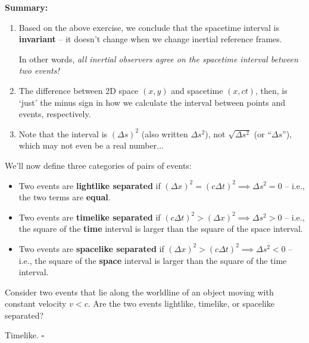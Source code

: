 \documentclass[11pt, letterpaper, openany]{book}
\newenvironment{exercise}[1][Exercise]{%
  \tcolorbox[blanker, breakable, left=1em,
    before skip=1em, after skip=1em,
    borderline west={3pt}{0pt}{PhysNavy},
    colback=PhysCream,
    before upper={\textcolor{PhysNavy}{\sffamily\bfseries #1:}\space}
  ]%
}{%
  \endtcolorbox%
}
\newenvironment{solution}[1][Solution]{%
  \tcolorbox[blanker, breakable, left=1em,
    before skip=1em, after skip=1em,
    borderline west={2pt}{0pt}{PhysTeal},
    colback=PhysCream,
    before upper={\textcolor{PhysTeal}{\sffamily\bfseries #1.}\space}
  ]%
}{%
  \hfill\textcolor{PhysTeal}{\ensuremath{\square}}\endtcolorbox%
}
\begin{document}
\textbf{Summary:}
\begin{enumerate}
    \item Based on the above exercise, we conclude that the spacetime interval is \textbf{invariant} -- it doesn't change when we change inertial reference frames.
    
    In other words, \textit{all inertial observers agree on the spacetime interval between two events!}
    \item The difference between 2D space $(x, y)$ and spacetime $(x, ct)$, then, is `just' the minus sign in how we calculate the interval between points and events, respectively.
    \item Note that the interval is $(\Delta s)^2$ (also written $\Delta s^2$), not $\sqrt{\Delta s^2}$ (or ``$\Delta s$''), which may not even be a real number...
\end{enumerate}

We'll now define three categories of pairs of events:

\begin{itemize}
    \item Two events are \textbf{lightlike separated} if $(\Delta x)^2 = (c\Delta t)^2 \implies \Delta s^2 = 0$
    -- i.e., the two terms are \textbf{equal}.
    
    \item Two events are \textbf{timelike separated} if $(c\Delta t)^2 > (\Delta x)^2 \implies \Delta s^2 > 0$
    -- i.e., the square of the \textbf{time} interval is larger than the square of the space interval.
    
    \item Two events are \textbf{spacelike separated} if $(\Delta x)^2 > (c\Delta t)^2 \implies \Delta s^2 < 0$
    -- i.e., the square of the \textbf{space} interval is larger than the square of the time interval.
\end{itemize}

\begin{exercise}[Exercise 3]
Consider two events that lie along the worldline of an object moving with constant velocity $v < c$. Are the two events lightlike, timelike, or spacelike separated?
\end{exercise}
\begin{solution}
Timelike.
\end{solution}
\end{document}
